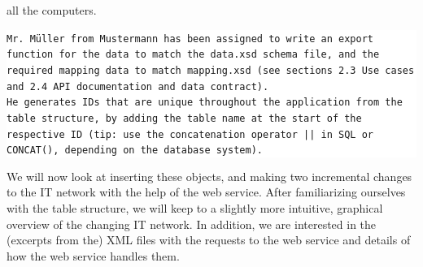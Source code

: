 \documentclass[a4paper,10pt]{book}
\begin{document}
all the computers.
\newline\newline
\colorbox{white}{\parbox{\textwidth}{
{\tt Mr. Müller from Mustermann has been assigned to write an export function for the data to match the data.xsd
schema file, and the required mapping data to match mapping.xsd (see sections 2.3 Use cases and 2.4 API documentation
and data contract).
\newline\\
He generates IDs that are unique throughout the application from the table structure, by adding the table name at the
start of the respective ID (tip: use the concatenation operator || in SQL or CONCAT(), depending on the database system).}
}}
\newline\newline
We will now look at inserting these objects, and making two incremental changes to the IT network with the help of
the web service. After familiarizing ourselves with the table structure, we will keep to a slightly more intuitive,
graphical overview of the changing IT network. In addition, we are interested in the (excerpts from the) XML files
with the requests to the web service and details of how the web service handles them.
\end{document}
